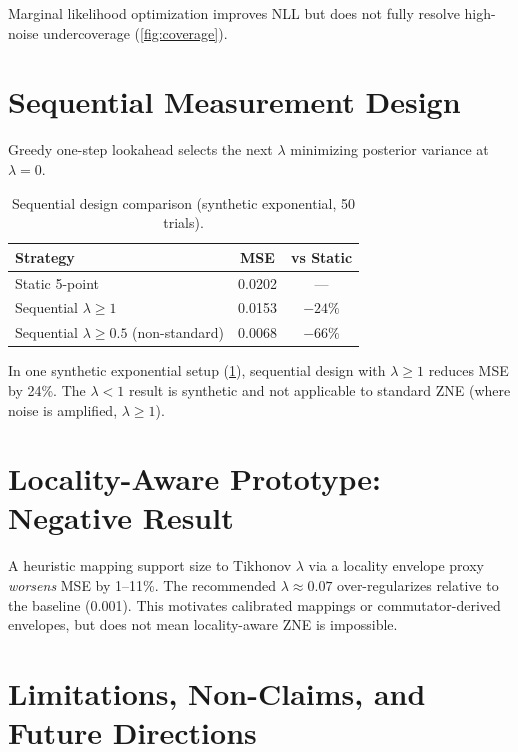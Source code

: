 \documentclass[aps,pra,twocolumn,superscriptaddress]{revtex4-2}
\begin{document}
Marginal likelihood optimization improves NLL but does not fully resolve high-noise undercoverage (\cref{fig:coverage}).

\section{Sequential Measurement Design}
\label{sec:sequential}

Greedy one-step lookahead selects the next $\lambda$ minimizing posterior variance at $\lambda=0$.

\begin{table}[b]
\caption{Sequential design comparison (synthetic exponential, 50 trials).}
\label{tab:sequential}
\begin{tabular}{lcc}
\toprule
Strategy & MSE & vs Static \\
\midrule
Static 5-point & 0.0202 & --- \\
Sequential $\lambda \geq 1$ & 0.0153 & $-24\%$ \\
Sequential $\lambda \geq 0.5$ (non-standard) & 0.0068 & $-66\%$ \\
\bottomrule
\end{tabular}
\end{table}

In one synthetic exponential setup (\cref{tab:sequential}), sequential design with $\lambda \geq 1$ reduces MSE by 24\%.
The $\lambda < 1$ result is synthetic and not applicable to standard ZNE (where noise is amplified, $\lambda \geq 1$).

\section{Locality-Aware Prototype: Negative Result}
\label{sec:locality}

A heuristic mapping support size to Tikhonov $\lambda$ via a locality envelope proxy \emph{worsens} MSE by 1--11\%.
The recommended $\lambda \approx 0.07$ over-regularizes relative to the baseline (0.001).
This motivates calibrated mappings or commutator-derived envelopes, but does not mean locality-aware ZNE is impossible.

\section{Limitations, Non-Claims, and Future Directions}
\label{sec:limitations}
\end{document}
